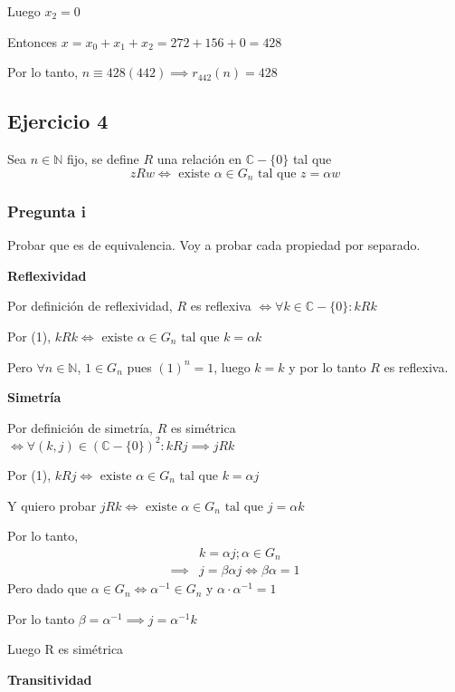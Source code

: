 Luego $ x_2 = 0 $

Entonces $ x = x_0 + x_1 + x_2 = 272 + 156 + 0 = 428 $

Por lo tanto, $ n \equiv 428(442) \implies r_{442}(n) = 428 $

\subsection{Ejercicio 4}

Sea $ n \in \mathbb{N} $ fijo, se define $ R $ una relación en $ \mathbb{C} - \{ 0 \} $ tal que
\begin{equation}
    z R w \iff \text{ existe } \alpha \in G_n \text{ tal que } z = \alpha w
\end{equation}
\subsubsection{Pregunta i}
Probar que es de equivalencia. Voy a probar cada propiedad por separado.

\textbf{Reflexividad}

Por definición de reflexividad, $ R $ es reflexiva $ \iff \forall k \in \mathbb{C}-\{ 0 \}: kRk $

Por (1), $ kRk \iff \text{ existe } \alpha \in G_n \text{ tal que } k = \alpha k $

Pero $ \forall n \in \mathbb{N} $, $ 1 \in G_n $ pues $ (1)^n = 1 $, luego $ k = k $ y por lo tanto $ R $ es reflexiva.

\textbf{Simetría}

Por definición de simetría, $ R $ es simétrica $ \iff \forall (k, j) \in (\mathbb{C} - \{ 0 \})^2: kRj \implies jRk $

Por (1), $ kRj \iff \text{ existe } \alpha \in G_n \text{ tal que } k = \alpha j $

Y quiero probar $ jRk \iff \text{ existe } \alpha \in G_n \text{ tal que } j = \alpha k $

Por lo tanto,
\begin{align*}
    &k = \alpha j; \alpha \in G_n \\
    \implies & j = \beta \alpha j \iff \beta \alpha = 1
\end{align*}
Pero dado que $ \alpha \in G_n \iff \alpha^{-1} \in G_n $ y $ \alpha \cdot \alpha^{-1} = 1 $

Por lo tanto $ \beta = \alpha^{-1} \implies j = \alpha^{-1}k $

Luego R es simétrica

\textbf{Transitividad}

